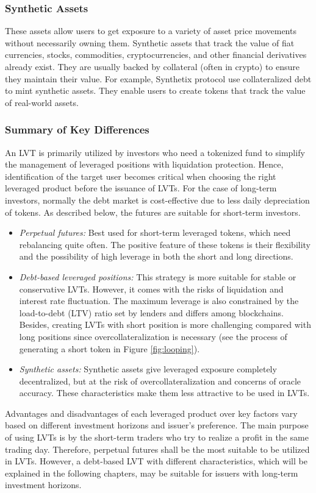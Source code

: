 \subsubsection{Synthetic Assets}
These assets allow users to get exposure to a variety of asset price movements without necessarily owning them. Synthetic assets that track the value of fiat currencies, stocks, commodities, cryptocurrencies, and other financial derivatives already exist. They are usually backed by collateral (often in crypto) to ensure they maintain their value. For example, Synthetix protocol use collateralized debt to mint synthetic assets. They enable users to create tokens that track the value of real-world assets.

\subsubsection{Summary of Key Differences}\label{appx:summary}
An LVT is primarily utilized by investors who need a tokenized fund to simplify the management of leveraged positions with liquidation protection. Hence, identification of the target user becomes critical when choosing the right leveraged product before the issuance of LVTs. For the case of long-term investors, normally the debt market is cost-effective due to less daily depreciation of tokens. As described below, the futures are suitable for short-term investors.

\begin{itemize}
	\item \textit{Perpetual futures:} Best used for short-term leveraged tokens, which need rebalancing quite often. The positive feature of these tokens is their flexibility and the possibility of high leverage in both the short and long directions.
	
	\item \textit{Debt-based leveraged positions:} This strategy is more suitable for stable or conservative LVTs. However, it comes with the risks of liquidation and interest rate fluctuation. The maximum leverage is also constrained by the load-to-debt (LTV) ratio set by lenders and differs among blockchains. Besides, creating LVTs with short position is more challenging compared with long positions since overcollateralization is necessary (see the process of generating a short token in Figure \ref{fig:looping}).
	
	\item \textit{Synthetic assets:} Synthetic assets give leveraged exposure completely decentralized, but at the risk of overcollateralization and concerns of oracle accuracy. These characteristics make them less attractive to be used in LVTs.
\end{itemize}
Advantages and disadvantages of each leveraged product over key factors vary based on different investment horizons and issuer's preference. The main purpose of using LVTs is by the short-term traders who try to realize a profit in the same trading day. Therefore, perpetual futures shall be the most suitable to be utilized in LVTs. However, a debt-based LVT with different characteristics, which will be explained in the following chapters, may be suitable for issuers with long-term investment horizons.

